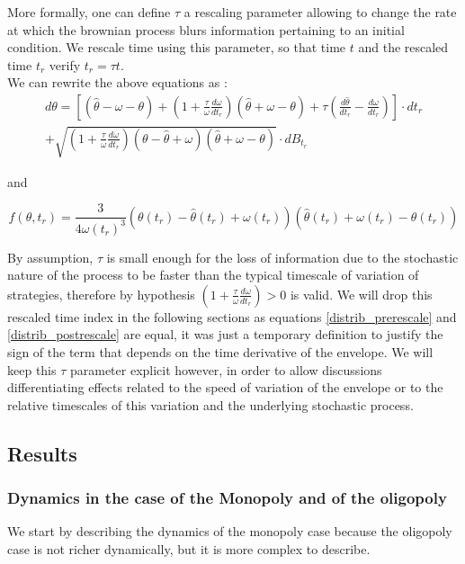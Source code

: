 More formally, one can define $\tau$ a rescaling parameter allowing to change the rate at which the brownian process blurs information pertaining to an initial condition. We rescale time using this parameter, so that time $t$ and the rescaled time $t_r$ verify $t_r=\tau t$. \\

We can rewrite the above equations as :
\begin{equation}
\begin{split}
  d\theta=\left[(\hat{\theta}-\omega-\theta)+\left(1+\frac{\tau}{\omega}\frac{d\omega}{dt_r}\right)(\hat{\theta}+\omega-\theta)+\tau\left(\frac{d\hat{\theta}}{dt_r}-\frac{d\omega}{dt_r}\right)\right]\cdot dt_r\\+\sqrt{\left(1+\frac{\tau}{\omega}\frac{d\omega}{dt_r}\right)(\theta-\hat{\theta}+\omega)(\hat{\theta}+\omega-\theta)}\cdot dB_{t_r}
\end{split}
\end{equation}

and 

\begin{equation}
f(\theta,t_r)=\frac{3}{4\omega(t_r)^3}(\theta(t_r)-\hat{\theta}(t_r)+\omega(t_r))(\hat{\theta}(t_r)+\omega(t_r)-\theta(t_r))
\label{distrib_postrescale}
\end{equation}

By assumption, $\tau$ is small enough for the loss of information due to the stochastic nature of the process to be faster than the typical timescale of variation of strategies, therefore by hypothesis $\left(1+\frac{\tau}{\omega}\frac{d\omega}{dt_r}\right)>0$ is valid. We will drop this rescaled time index in the following sections as equations \ref{distrib_prerescale} and \ref{distrib_postrescale} are equal, it was just a temporary definition to justify the sign of the term that depends on the time derivative of the envelope. We will keep this $\tau$ parameter explicit however, in order to allow discussions differentiating effects related to the speed of variation of the envelope or to the relative timescales of this variation and the underlying stochastic process.

\subsection{Results}
\subsubsection{Dynamics in the case of the Monopoly and of the oligopoly}
We start by describing the dynamics of the monopoly case because the oligopoly case is not richer dynamically, but it is more complex to describe. \\

